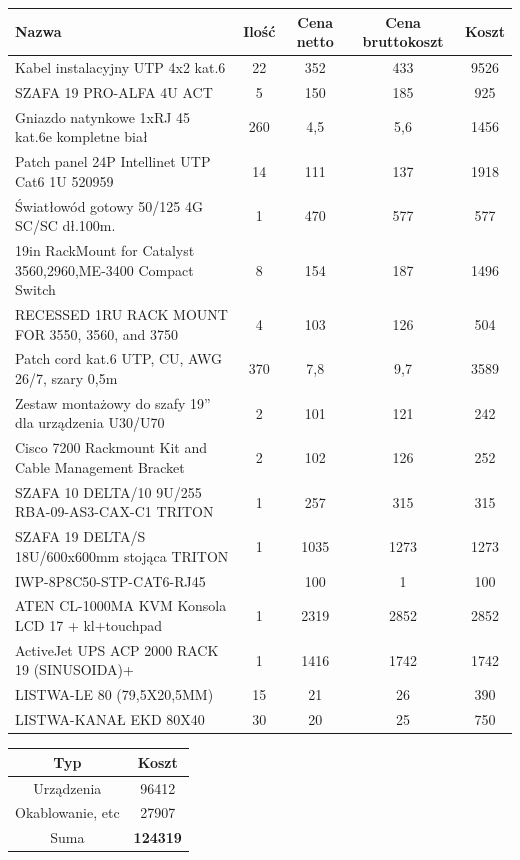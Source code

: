 \begin{center}
    \begin{tabular}{|p{6cm}|c|c|c|c|}
    \hline
Nazwa &	Ilość	&Cena netto	&Cena bruttokoszt	&Koszt \\ \hline
Kabel instalacyjny UTP 4x2 kat.6	&22&	352	&433	&9526\\ \hline
SZAFA 19 PRO-ALFA 4U ACT	&5	&150	&185	&925\\ \hline
Gniazdo natynkowe 1xRJ 45 kat.6e kompletne biał	&260	&4,5	&5,6	&1456\\ \hline
Patch panel 24P Intellinet UTP Cat6 1U 520959	&14	&111	&137	&1918\\ \hline
Światłowód gotowy 50/125 4G SC/SC dł.100m.	&1&	470&	577&	577\\ \hline
19in RackMount for Catalyst 3560,2960,ME-3400 Compact Switch	&8	&154	&187	&1496\\ \hline
RECESSED 1RU RACK MOUNT FOR 3550, 3560, and 3750	&4	&103	&126	&504\\ \hline
Patch cord kat.6 UTP, CU, AWG 26/7, szary 0,5m&	370&	7,8&	9,7&	3589\\ \hline
Zestaw montażowy do szafy 19” dla urządzenia U30/U70	&2	&101	&121	&242\\ \hline
Cisco 7200 Rackmount Kit and Cable Management Bracket	&2	&102	&126	&252\\ \hline
SZAFA 10 DELTA/10 9U/255 RBA-09-AS3-CAX-C1 TRITON	&1	&257	&315	&315\\ \hline
SZAFA 19 DELTA/S 18U/600x600mm stojąca TRITON	&1	&1035	&1273	&1273 \\ \hline
IWP-8P8C50-STP-CAT6-RJ45&	&100		&1	&100\\ \hline
ATEN CL-1000MA KVM Konsola LCD 17 + kl+touchpad	&1	&2319	&2852	&2852 \\ \hline
ActiveJet UPS ACP 2000 RACK 19 (SINUSOIDA)+	&1	&1416	&1742	&1742 \\ \hline
LISTWA-LE 80  (79,5X20,5MM)&15	& 21 	&26	&390 \\ \hline
LISTWA-KANAŁ EKD 80X40	& 30	& 20 & 25	&750 \\ \hline

\end{tabular}
\end{center}

\begin{center}
    \begin{tabular}{|c|c|}
    \hline
 Typ & Koszt \\ \hline
 Urządzenia & 96412 \\ \hline
 Okablowanie, etc & 27907 \\ \hline
 Suma & \textbf{124319} \\ \hline
\end{tabular}
\end{center}
